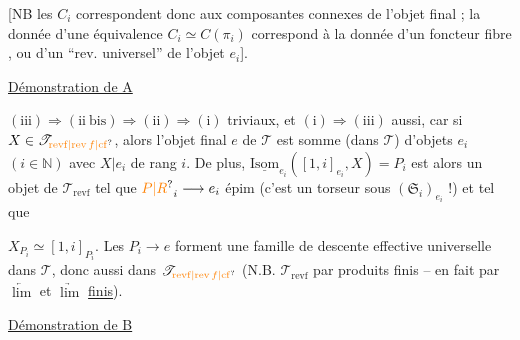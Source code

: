 [NB les $C_i$ correspondent donc aux composantes connexes  de l'objet final ; la donnée d'une équivalence $C_i\simeq C(\pi_i)$ correspond à la donnée d'un foncteur fibre , ou d'un ``rev. universel'' de l'objet  $e_i$].

\uline{Démonstration de A}

$(\mathrm{iii})\Longrightarrow(\mathrm{ii\ bis})\Longrightarrow(\mathrm{ii})\Longrightarrow(\mathrm{i})$ triviaux, et $(\mathrm{i})\Longrightarrow(\mathrm{iii})$ aussi, car si $X\in\mathscr T_{\unsure{\mathrm{revf}|\mathrm{rev}\,f|\mathrm{cf}}}$, alors l'objet final $e$ de $\mathscr T$ est somme (dans $\mathscr T$) d'objets $e_i$ $(i\in\mathbb N)$ avec $X|e_i$ de rang $i$. De plus, $\underline{\mathrm{Isom}}_{e_i}([1,i]_{e_i},X)=P_i$ est alors un objet de $\mathscr T_{\mathrm{revf}}$ tel que $\unsure{P|R}_i\longrightarrow e_i$ épim (c'est un torseur sous $(\mathfrak S_i)_{e_i}$ !) et tel que


$X_{P_i}\simeq[1,i]_{P_i}$. Les $P_i\longrightarrow e$ forment une famille  de descente effective universelle  dans $\mathscr T$, donc aussi dans $\mathscr T_{\unsure{\mathrm{revf}|\mathrm{rev}\,f|\mathrm{cf}}}$ (N.B. $\mathscr T_{\mathrm{revf}}$  par produits finis -- en fait par $\underleftarrow{\lim}$ et $\underrightarrow{\lim}$ \uline{finis}).

\uline{Démonstration de B}

 

    

       

